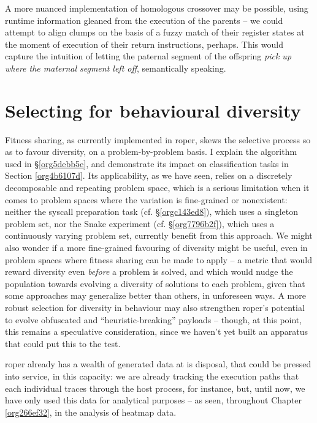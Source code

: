 \documentclass[12pt,glossary]{dalthesis}
\begin{document}
A more nuanced implementation of homologous crossover may be possible, using
runtime information gleaned from the execution of the parents -- we could
attempt to align clumps on the basis of a fuzzy match of their register states
at the moment of execution of their return instructions, perhaps. This would
capture the intuition of letting the paternal segment of the offspring \emph{pick up
where the maternal segment left off}, semantically speaking.


\section{Selecting for behavioural diversity}
\label{sec:orgb603c9b}
\label{org206ba28}

Fitness sharing, as currently implemented in \gls{roper}, skews the selective process
so as to favour diversity, on a problem-by-problem basis. I explain the algorithm
used in \S \ref{org5debb5e}, and demonstrate its impact on classification tasks in 
Section \ref{org4b6107d}. Its applicability, as we have seen, relies
on a discretely decomposable and repeating problem space, which is a serious limitation
when it comes to problem spaces where the variation is fine-grained or nonexistent:
neither the syscall preparation task (cf. \S \ref{orgc143ed8}), which uses a
singleton problem set, nor the
Snake experiment (cf. \S \ref{org7796b2f}), which uses a continuously
varying problem set, currently benefit from this approach. We might also wonder if
a more fine-grained favouring of diversity might be useful, even in problem spaces
where fitness sharing can be made to apply -- a metric that would reward diversity
even \emph{before} a problem is solved, and which would nudge the population towards
evolving a diversity of solutions to each problem, given that some approaches may
generalize better than others, in unforeseen ways. A more robust selection for
diversity in behaviour may also strengthen \gls{roper}'s potential to evolve 
obfuscated and ``heuristic-breaking'' payloads -- though, at this point, this remains
a speculative consideration, since we haven't yet built an apparatus that could
put this to the test. 

\Gls{roper} already has a wealth of generated data at is disposal, that could be
pressed into service, in this capacity: we are already tracking the execution
paths that each individual traces through the host process, for instance, but,
until now, we have only used this data for analytical purposes -- as seen,
throughout Chapter \ref{org266ef32}, in the analysis of heatmap data. 
\end{document}
